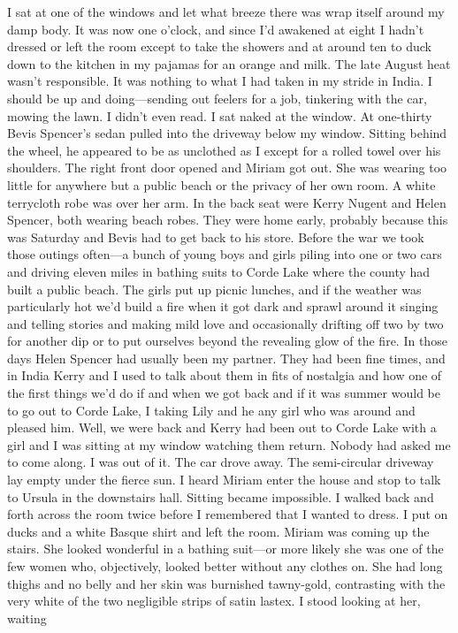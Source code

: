 \documentclass{novel}
\begin{document}
\begin{ChapterStart}

\vspace{3\nbs}
\end{ChapterStart}


I sat at one of the windows and let what breeze there was wrap itself around my damp body. It was now one o’clock, and since I’d awakened at eight I hadn’t dressed or left the room except to take the showers and at around ten to duck down to the kitchen in my pajamas for an orange and milk. The late August heat wasn’t responsible. It was nothing to what I had taken in my stride in India. I should be up and doing—sending out feelers for a job, tinkering with the car, mowing the lawn. I didn’t even read. I sat naked at the window. At one-thirty Bevis Spencer’s sedan pulled into the driveway below my window. Sitting behind the wheel, he appeared to be as unclothed as I except for a rolled towel over his shoulders. The right front door opened and Miriam got out. She was wearing too little for anywhere but a public beach or the privacy of her own room. A white terrycloth robe was over her arm. In the back seat were Kerry Nugent and Helen Spencer, both wearing beach robes. They were home early, probably because this was Saturday and Bevis had to get back to his store. Before the war we took those outings often—a bunch of young boys and girls piling into one or two cars and driving eleven miles in bathing suits to Corde Lake where the county had built a public beach. The girls put up picnic lunches, and if the weather was particularly hot we’d build a fire when it got dark and sprawl around it singing and telling stories and making mild love and occasionally drifting off two by two for another dip or to put ourselves beyond the revealing glow of the fire. In those days Helen Spencer had usually been my partner. They had been fine times, and in India Kerry and I used to talk about them in fits of nostalgia and how one of the first things we’d do if and when we got back and if it was summer would be to go out to Corde Lake, I taking Lily and he any girl who was around and pleased him. Well, we were back and Kerry had been out to Corde Lake with a girl and I was sitting at my window watching them return. Nobody had asked me to come along. I was out of it. The car drove away. The semi-circular driveway lay empty under the fierce sun. I heard Miriam enter the house and stop to talk to Ursula in the downstairs hall. Sitting became impossible. I walked back and forth across the room twice before I remembered that I wanted to dress. I put on ducks and a white Basque shirt and left the room. Miriam was coming up the stairs. She looked wonderful in a bathing suit—or more likely she was one of the few women who, objectively, looked better without any clothes on. She had long thighs and no belly and her skin was burnished tawny-gold, contrasting with the very white of the two negligible strips of satin lastex. I stood looking at her, waiting 
\end{document}
